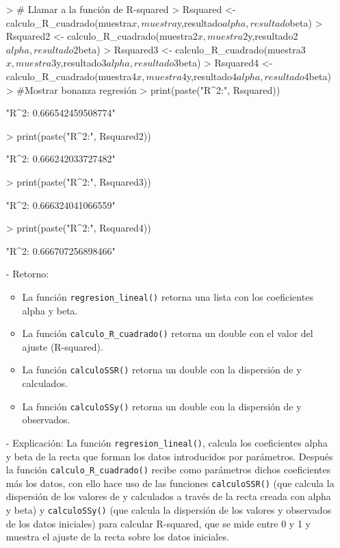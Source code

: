 \documentclass[a4paper, 12pt]{article}
\begin{document}
\begin{itemize}
\begin{Schunk}
\begin{Sinput}
> # Llamar a la función de R-squared
> Rsquared <- calculo_R_cuadrado(muestra$x,muestra$y,resultado$alpha,resultado$beta)
> Rsquared2 <- calculo_R_cuadrado(muestra2$x,muestra2$y,resultado2$alpha,resultado2$beta)
> Rsquared3 <- calculo_R_cuadrado(muestra3$x,muestra3$y,resultado3$alpha,resultado3$beta)
> Rsquared4 <- calculo_R_cuadrado(muestra4$x,muestra4$y,resultado4$alpha,resultado4$beta)
> #Mostrar bonanza regresión
> print(paste("R^2:", Rsquared))
\end{Sinput}
\begin{Soutput}
[1] "R^2: 0.666542459508774"
\end{Soutput}
\begin{Sinput}
> print(paste("R^2:", Rsquared2))
\end{Sinput}
\begin{Soutput}
[1] "R^2: 0.666242033727482"
\end{Soutput}
\begin{Sinput}
> print(paste("R^2:", Rsquared3))
\end{Sinput}
\begin{Soutput}
[1] "R^2: 0.666324041066559"
\end{Soutput}
\begin{Sinput}
> print(paste("R^2:", Rsquared4))
\end{Sinput}
\begin{Soutput}
[1] "R^2: 0.666707256898466"
\end{Soutput}
\end{Schunk}
				
				\item[-] Retorno:
				\begin{itemize}
				  \item La función \texttt{regresion\_lineal()} retorna una lista con los coeficientes alpha y beta.
				  \item La función \texttt{calculo\_R\_cuadrado()} retorna un double con el valor del ajuste (R-squared).
				  \item La función \texttt{calculoSSR()} retorna un double con la dispersión de y calculados.
				  \item La función \texttt{calculoSSy()} retorna un double con la dispersión de y observados.
				\end{itemize}
				
				\item[-] Explicación: La función \texttt{regresion\_lineal()}, calcula los coeficientes alpha y beta de la recta que forman los datos introducidos por parámetros. Después la función \texttt{calculo\_R\_cuadrado()} recibe como parámetros dichos coeficientes más los datos, con ello hace uso de las funciones \texttt{calculoSSR()} (que calcula la dispersión de los valores de y calculados a través de la recta creada con alpha y beta) y \texttt{calculoSSy()} (que calcula la dispersión de los valores y observados de los datos iniciales) para calcular R-squared, que se mide entre 0 y 1 y muestra el ajuste de la recta sobre los datos iniciales.

			\end{itemize}
\end{document}
